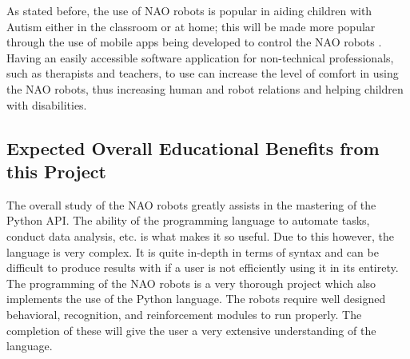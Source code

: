 As stated before, the use of NAO robots is popular in aiding children with Autism either in the classroom or at home; this will be made more popular through the use of mobile apps being developed to control the NAO robots \cite{7006084}.  Having an easily accessible software application for non-technical professionals, such as therapists and teachers, to use can increase the level of comfort in using the NAO robots, thus increasing human and robot relations and helping children with disabilities.\par

\subsection{Expected Overall Educational Benefits from this Project}

The overall study of the NAO robots greatly assists in the mastering of the Python API. The ability of the programming language to automate tasks, conduct data analysis, etc. is what makes it so useful. Due to this however, the language is very complex. It is quite in-depth in terms of syntax and can be difficult to produce results with if a user is not efficiently using it in its entirety. The programming of the NAO robots is a very thorough project which also implements the use of the Python language. The robots require well designed behavioral, recognition, and reinforcement modules to run properly. The completion of these will give the user a very extensive understanding of the language.\par